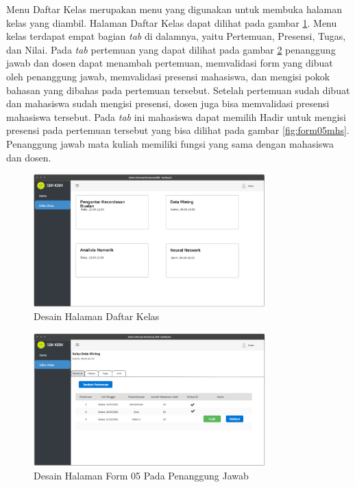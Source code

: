 Menu Daftar Kelas merupakan menu yang digunakan untuk membuka halaman kelas yang diambil. Halaman Daftar Kelas dapat dilihat pada gambar \ref{fig:daftarkelas}. Menu kelas terdapat empat bagian \textit{tab} di dalamnya, yaitu Pertemuan, Presensi, Tugas, dan Nilai. Pada \textit{tab} pertemuan yang dapat dilihat pada gambar \ref{fig:form05pj} penanggung jawab dan dosen dapat menambah pertemuan, memvalidasi form yang dibuat oleh penanggung jawab, memvalidasi presensi mahasiswa, dan mengisi pokok bahasan yang dibahas pada pertemuan tersebut. Setelah pertemuan sudah dibuat dan mahasiswa sudah mengisi presensi, dosen juga bisa memvalidasi presensi mahasiswa tersebut. Pada \textit{tab} ini mahasiswa dapat memilih Hadir untuk mengisi presensi pada pertemuan tersebut yang bisa dilihat pada gambar \ref{fig:form05mhs}. Penanggung jawab mata kuliah memiliki fungsi yang sama dengan mahasiswa dan dosen.

\begin{figure}[h!]
	\centering
	\includegraphics[width=0.8\textwidth]{gambar/mockup/daftar_kelas}
	\caption{Desain Halaman Daftar Kelas}
	\label{fig:daftarkelas}
\end{figure}

\begin{figure}[h!]
	\centering
	\includegraphics[width=0.8\textwidth]{gambar/mockup/form05_pj}
	\caption{Desain Halaman Form 05 Pada Penanggung Jawab}
	\label{fig:form05pj}
\end{figure}

